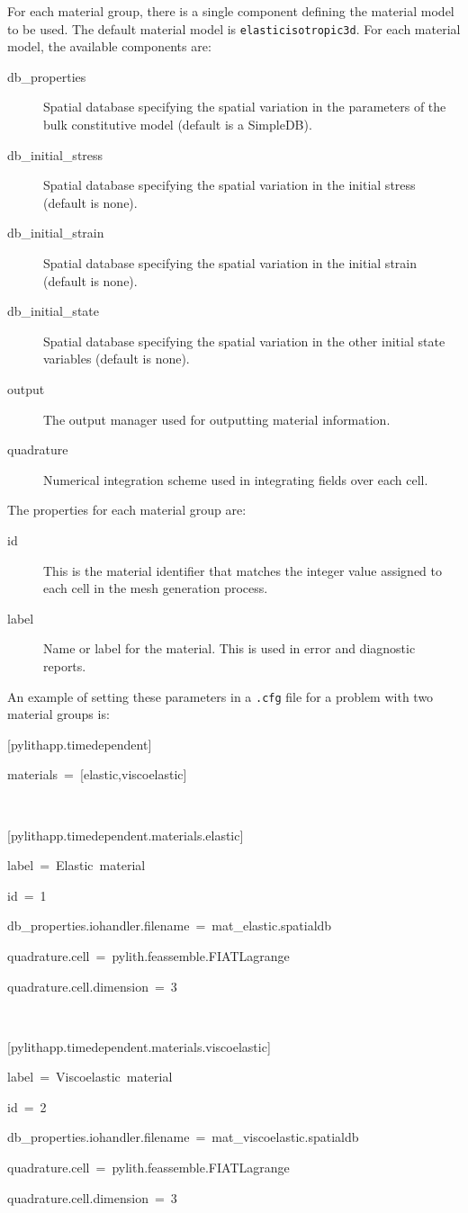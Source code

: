 For each material group, there is a single component defining the
material model to be used. The default material model is \texttt{elasticisotropic3d}.
For each material model, the available components are:
\begin{description}
\item [{db\_properties}] Spatial database specifying the spatial variation
in the parameters of the bulk constitutive model (default is a SimpleDB).
\item [{db\_initial\_stress}] Spatial database specifying the spatial variation
in the initial stress (default is none).
\item [{db\_initial\_strain}] Spatial database specifying the spatial variation
in the initial strain (default is none).
\item [{db\_initial\_state}] Spatial database specifying the spatial variation
in the other initial state variables (default is none).
\item [{output}] The output manager used for outputting material information.
\item [{quadrature}] Numerical integration scheme used in integrating fields
over each cell.
\end{description}
The properties for each material group are:
\begin{description}
\item [{id}] This is the material identifier that matches the integer value
assigned to each cell in the mesh generation process.
\item [{label}] Name or label for the material. This is used in error and
diagnostic reports.
\end{description}
An example of setting these parameters in a \texttt{.cfg} file for
a problem with two material groups is:
\begin{lyxcode}
{[}pylithapp.timedependent{]}

materials~=~{[}elastic,viscoelastic{]}

~

{[}pylithapp.timedependent.materials.elastic{]}

label~=~Elastic~material

id~=~1

db\_properties.iohandler.filename~=~mat\_elastic.spatialdb

quadrature.cell~=~pylith.feassemble.FIATLagrange

quadrature.cell.dimension~=~3

~

{[}pylithapp.timedependent.materials.viscoelastic{]}

label~=~Viscoelastic~material

id~=~2

db\_properties.iohandler.filename~=~mat\_viscoelastic.spatialdb

quadrature.cell~=~pylith.feassemble.FIATLagrange

quadrature.cell.dimension~=~3
\end{lyxcode}
